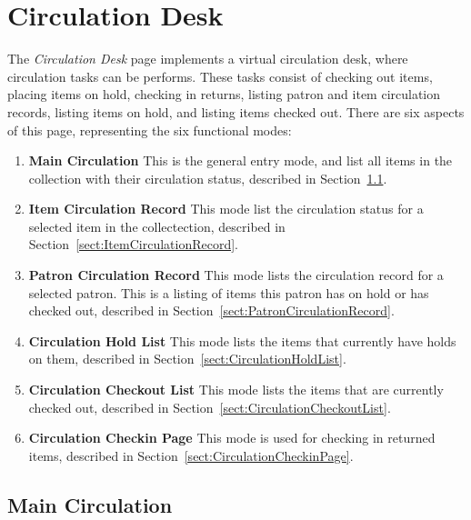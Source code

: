 \documentclass[letterpaper,twoside]{article}
\begin{document}
\section{Circulation Desk}

The \textit{Circulation Desk} page implements a virtual circulation
desk, where circulation tasks can be performs.  These tasks consist of
checking out items, placing items on hold, checking in returns, listing
patron and item circulation records, listing items on hold, and listing
items checked out.  There are six aspects of this page, representing the
six functional modes:

\begin{enumerate}
\item \textbf{Main Circulation} This is the general entry mode, and
list all items in the collection with their circulation status,
described in Section~\ref{sect:MainCirculation}.
\item \textbf{Item Circulation Record} This mode list the circulation
status for a selected item in the collectection,
described in Section~\ref{sect:ItemCirculationRecord}.
\item \textbf{Patron Circulation Record} This mode lists the
circulation record for a selected patron.  This is a listing of items
this patron has on hold or has checked out, described in
Section~\ref{sect:PatronCirculationRecord}.
\item \textbf{Circulation Hold List} This mode lists the items that
currently have holds on them, described in
Section~\ref{sect:CirculationHoldList}.
\item \textbf{Circulation Checkout List} This mode lists the items that
are currently checked out, described in
Section~\ref{sect:CirculationCheckoutList}.
\item \textbf{Circulation Checkin Page} This mode is used for checking
in returned items, described in
Section~\ref{sect:CirculationCheckinPage}.
\end{enumerate}

\subsection{Main Circulation}
\label{sect:MainCirculation}
\end{document}
